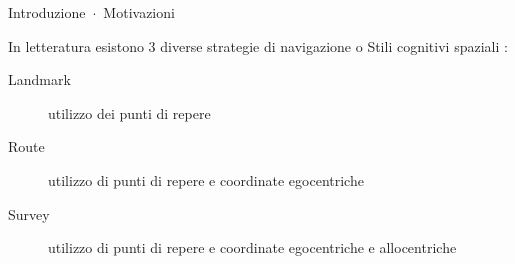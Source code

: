 \begin{frame}[plain]{\alert{Introduzione}~$\cdot$~Motivazioni}
\label{frm:intro:2}

  In letteratura esistono 3 diverse strategie di navigazione o \alert{Stili cognitivi spaziali} \parencite{pazzaglia2000differenze}:
  \begin{description}
      \item [\alert{Landmark}] utilizzo dei punti di repere
      \item [\alert{Route}] utilizzo di punti di repere e coordinate egocentriche
      \item [\alert{Survey}] utilizzo di punti di repere e coordinate egocentriche e allocentriche
  \end{description}

\end{frame}
